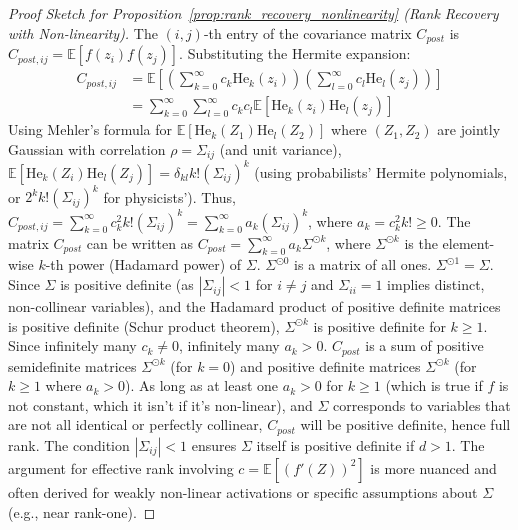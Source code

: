 \documentclass{article}
\newcommand{\E}{\mathbb{E}}
\newcommand{\He}{\mathrm{He}}
\begin{document}
\begin{proof}[Proof Sketch for Proposition~\ref{prop:rank_recovery_nonlinearity} (Rank Recovery with Non-linearity)]
The $(i, j)$-th entry of the covariance matrix $C_{post}$ is $C_{post, ij} = \E[f(z_i) f(z_j)]$. Substituting the Hermite expansion:
\begin{align*}
C_{post, ij} &= \E\left[ \left( \sum_{k=0}^{\infty} c_k \He_k(z_i) \right) \left( \sum_{l=0}^{\infty} c_l \He_l(z_j) \right) \right] \\
&= \sum_{k=0}^{\infty} \sum_{l=0}^{\infty} c_k c_l \E[\He_k(z_i) \He_l(z_j)]
\end{align*}
Using Mehler's formula for $\E[\He_k(Z_1) \He_l(Z_2)]$ where $(Z_1, Z_2)$ are jointly Gaussian with correlation $\rho = \Sigma_{ij}$ (and unit variance), $\E[\He_k(Z_i) \He_l(Z_j)] = \delta_{kl} k! (\Sigma_{ij})^k$ (using probabilists' Hermite polynomials, or $2^k k! (\Sigma_{ij})^k$ for physicists').
Thus,
$C_{post, ij} = \sum_{k=0}^{\infty} c_k^2 k! (\Sigma_{ij})^k = \sum_{k=0}^{\infty} a_k (\Sigma_{ij})^k$, where $a_k = c_k^2 k! \ge 0$.
The matrix $C_{post}$ can be written as $C_{post} = \sum_{k=0}^{\infty} a_k \Sigma^{\odot k}$, where $\Sigma^{\odot k}$ is the element-wise $k$-th power (Hadamard power) of $\Sigma$.
$\Sigma^{\odot 0}$ is a matrix of all ones. $\Sigma^{\odot 1} = \Sigma$.
Since $\Sigma$ is positive definite (as $|\Sigma_{ij}|<1$ for $i \ne j$ and $\Sigma_{ii}=1$ implies distinct, non-collinear variables), and the Hadamard product of positive definite matrices is positive definite (Schur product theorem), $\Sigma^{\odot k}$ is positive definite for $k \ge 1$.
Since infinitely many $c_k \neq 0$, infinitely many $a_k > 0$.
$C_{post}$ is a sum of positive semidefinite matrices $\Sigma^{\odot k}$ (for $k=0$) and positive definite matrices $\Sigma^{\odot k}$ (for $k \ge 1$ where $a_k > 0$). As long as at least one $a_k > 0$ for $k \ge 1$ (which is true if $f$ is not constant, which it isn't if it's non-linear), and $\Sigma$ corresponds to variables that are not all identical or perfectly collinear, $C_{post}$ will be positive definite, hence full rank. The condition $|\Sigma_{ij}| < 1$ ensures $\Sigma$ itself is positive definite if $d > 1$.
The argument for effective rank involving $c = \E[(f'(Z))^2]$ is more nuanced and often derived for weakly non-linear activations or specific assumptions about $\Sigma$ (e.g., near rank-one).
\end{proof}
\end{document}
